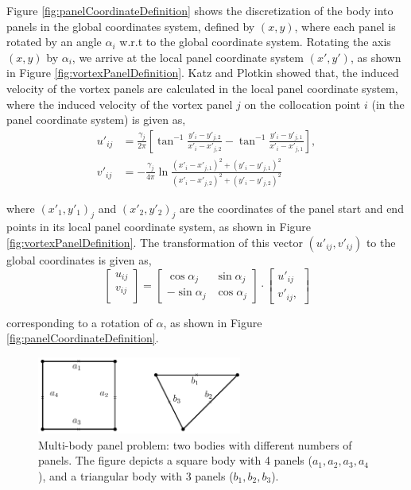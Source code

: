 Figure \ref{fig:panelCoordinateDefinition} shows the discretization of the body into panels in the global coordinates system, defined by $(x,y)$, where each panel is rotated by an angle $\alpha_i$ w.r.t to the global coordinate system. Rotating the axis $(x,y)$ by $\alpha_i$, we arrive at the local panel coordinate system $(x',y')$, as shown in Figure \ref{fig:vortexPanelDefinition}. Katz and Plotkin \cite{Katz2001a} showed that, the induced velocity of the vortex panels are calculated in the local panel coordinate system, where the induced velocity of the vortex panel $j$ on the collocation point $i$ (in the panel coordinate system) is given as,
	\begin{subequations}
	\begin{align}
	u'_{ij} &= \frac{\gamma_j}{2\pi}\left[\tan^{-1}\frac{y'_i-y'_{j,2}}{x'_i-x'_{j,2}} - \tan^{-1}\frac{y'_i-y'_{j,1}}{x'_i -x'_{j,1}}\right],\\
	v'_{ij} &= -\frac{\gamma_j}{4\pi}\ln\frac{\left(x'_i-x'_{j,1}\right)^2 + \left(y'_i-y'_{j,1}\right)^2}{\left(x'_i-x'_{j,2}\right)^2+\left(y'_i-y'_{j,2}\right)^2}
	\end{align}
	\end{subequations}

where $(x'_1,y'_1)_j$ and $(x'_2,y'_2)_j$ are the coordinates of the panel start and end points in its local panel coordinate system, as shown in Figure \ref{fig:vortexPanelDefinition}. The transformation of this vector $(u'_{ij}, v'_{ij})$ to the global coordinates is given as,
	\begin{equation}
	\begin{bmatrix}
	u_{ij}\\
	v_{ij}\\
	\end{bmatrix} = \begin{bmatrix}
	\cos\alpha_j & \sin\alpha_j \\
	-\sin\alpha_j & \cos\alpha_j
	\end{bmatrix} \cdot \begin{bmatrix}
	u'_{ij}\\
	v'_{ij},
	\end{bmatrix}
	\end{equation}

corresponding to a rotation of $\alpha$, as shown in Figure \ref{fig:panelCoordinateDefinition}.

	\begin{figure}[!t]
	\centering
	\includegraphics[width=0.6\textwidth]{figures/lagrangian/twoPanelBodies.pdf}
	\caption{Multi-body panel problem: two bodies with different numbers of panels. The figure depicts a square body with 4 panels ($a_1, a_2, a_3, a_4$), and a triangular body with 3 panels ($b_1, b_2, b_3$). }
	\label{fig:twoPanelBodies}
	\end{figure}

